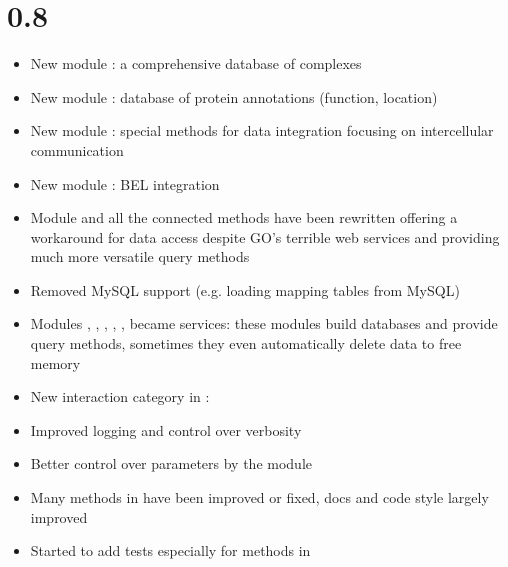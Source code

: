 \documentclass[letterpaper,10pt,english]{sphinxmanual}
\begin{document}
\section{0.8}
\label{\detokenize{index:id14}}\begin{itemize}
\item {} 
New module : a comprehensive database of complexes

\item {} 
New module : database of protein annotations (function, location)

\item {} 
New module : special methods for data integration focusing on intercellular communication

\item {} 
New module : BEL integration

\item {} 
Module  and all the connected  methods have been rewritten offering a workaround for
data access despite GO’s terrible web services and providing much more versatile query methods

\item {} 
Removed MySQL support (e.g. loading mapping tables from MySQL)

\item {} 
Modules , , , , ,  became services:
these modules build databases and provide query methods, sometimes they even automatically
delete data to free memory

\item {} 
New interaction category in : 

\item {} 
Improved logging and control over verbosity

\item {} 
Better control over parameters by the  module

\item {} 
Many methods in  have been improved or fixed, docs and code style largely improved

\item {} 
Started to add tests especially for methods in 

\end{itemize}
\end{document}
